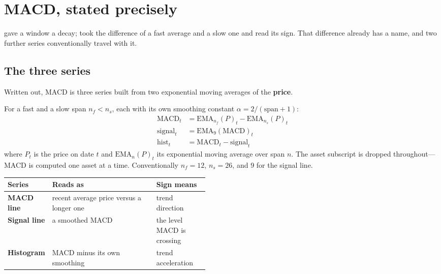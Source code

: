 \section{MACD, stated precisely}\label{sec:macd}

 gave a window a decay;  took the difference of a fast
average and a slow one and read its sign. That difference already has a name, and two further series
conventionally travel with it.

\subsection{The three series}\label{sec:three-series}

Written out, MACD is three series built from two exponential moving averages of the \textbf{price}.

\begin{definition}[MACD]\label{def:macd}
For a fast and a slow span $n_f < n_s$, each with its own smoothing constant
$\alpha = 2/(\text{span} + 1)$:
\begin{align*}
  \mathrm{MACD}_t   &= \mathrm{EMA}_{n_f}(P)_t - \mathrm{EMA}_{n_s}(P)_t \\
  \mathrm{signal}_t &= \mathrm{EMA}_9(\mathrm{MACD})_t \\
  \mathrm{hist}_t   &= \mathrm{MACD}_t - \mathrm{signal}_t
\end{align*}
where $P_t$ is the price on date $t$ and $\mathrm{EMA}_n(P)_t$ its exponential moving average over
span $n$. The asset subscript is dropped throughout---MACD is computed one asset at a time.
Conventionally $n_f = 12$, $n_s = 26$, and 9 for the signal line.
\end{definition}

\begin{tabularx}{\linewidth}{|>{\raggedright\arraybackslash}p{0.20\linewidth}|X|>{\raggedright\arraybackslash}p{0.26\linewidth}|}
\hline
\textbf{Series} & \textbf{Reads as} & \textbf{Sign means} \\ \hline
\textbf{MACD line}   & recent average price versus a longer one & trend direction \\ \hline
\textbf{Signal line} & a smoothed MACD                          & the level MACD is crossing \\ \hline
\textbf{Histogram}   & MACD minus its own smoothing             & trend acceleration \\ \hline
\end{tabularx}

